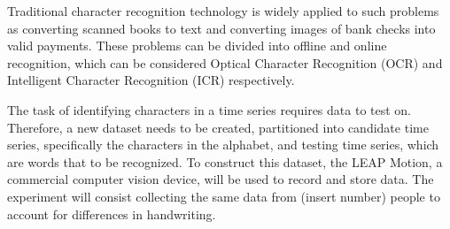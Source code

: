 Traditional character recognition technology is widely applied to such problems as converting scanned books to text and converting images of bank checks into valid payments. These problems can be divided into offline and online recognition, which can be considered Optical Character Recognition (OCR) and Intelligent Character Recognition (ICR) respectively. 

The task of identifying characters in a time series requires data to test on. Therefore, a new dataset needs to be created, partitioned into candidate time series, specifically the characters in the alphabet, and testing time series, which are words that to be recognized. To construct this dataset, the LEAP Motion, a commercial computer vision device, will be used to record and store data. The experiment will consist collecting the same data from  (insert number) people to account for differences in handwriting.
